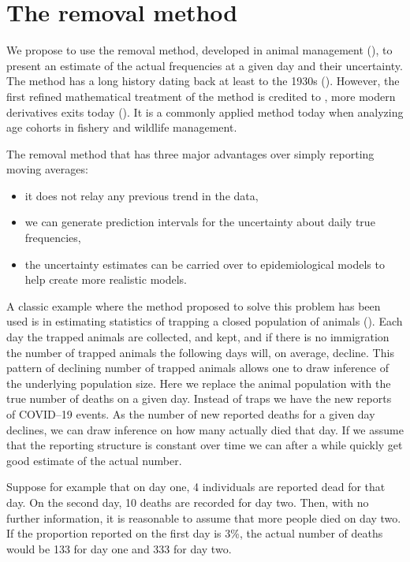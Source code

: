 \documentclass[a4paper,11pt,article,oneside,openany,american]{memoir}
\begin{document}
\chapter{The removal method}
We propose to use the removal method, developed in animal management (\cite{Pollock1991_review_papers}), to present an estimate of the actual frequencies at a given day and their uncertainty. The method has a long history dating back at least to the 1930s (\cite{Leslie1939_attempt_determine}). However, the first refined mathematical treatment of the method is credited to \cite{Moran1951_mathematical_theory}, more modern derivatives exits today (\cite{Matechou2016_open_models}). It is a commonly applied method today when analyzing age cohorts in fishery and wildlife management.

The removal method that has three major advantages over simply reporting moving averages:

\begin{itemize}
	\item it does not relay any previous trend in the data,
	\item we can generate prediction intervals for the uncertainty about daily true frequencies,
	\item the uncertainty estimates can be carried over to epidemiological models to help create more realistic models.
\end{itemize}

A classic example where the method proposed to solve this problem has been used is in estimating statistics of trapping a closed population of animals (\cite{Pollock1991_review_papers}). Each day the trapped animals are collected, and kept, and if there is no immigration the number of trapped animals the following days will, on average, decline. This pattern of declining number of trapped animals allows one to draw inference of the underlying population size. Here we replace the animal population with the true number of deaths
on a given day. Instead of traps we have the new reports of COVID--19 events. As the number of new reported deaths for a given day declines, we can draw inference on how many actually died that day. If we assume that the reporting structure is constant over time we can after a while quickly get good estimate of the actual number.

Suppose for example that on day one, 4 individuals are reported dead for that day. On the second day, 10 deaths are recorded for day two. Then, with no further information, it is reasonable to assume that more people died on day two. If the proportion reported on the first day is 3\%, the actual number of deaths would be 133 for day one and 333 for day two.
\end{document}
